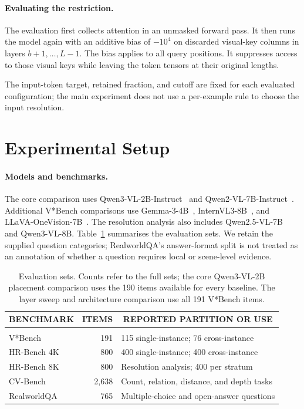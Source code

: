 \documentclass{article} %
\begin{document}
\paragraph{Evaluating the restriction.}
The evaluation first collects attention in an unmasked forward pass.
It then runs the model again with an additive bias of \(-10^4\) on
discarded visual-key columns in layers \(b+1,\ldots,L-1\). The bias
applies to all query positions. It suppresses access to those visual
keys while leaving the token tensors at their original lengths.

The input-token target, retained fraction, and cutoff are fixed for
each evaluated configuration; the main experiment does not use a
per-example rule to choose the input resolution.

\section{Experimental Setup}
\label{sec:method_evaluation}


\paragraph{Models and benchmarks.}
The core comparison uses Qwen3-VL-2B-Instruct~\citep{qwen3vl}
and Qwen2-VL-7B-Instruct~\citep{wang2024qwen2vl}.
Additional V*Bench comparisons use Gemma-3-4B~\citep{gemma3},
InternVL3-8B~\citep{internvl3}, and
LLaVA-OneVision-7B~\citep{li2024llavaonevision}. The resolution analysis
also includes Qwen2.5-VL-7B~\citep{qwen25vl} and Qwen3-VL-8B. Table~\ref{tab:eval_data} summarises
the evaluation sets. We retain the supplied question categories;
RealworldQA's answer-format split is not treated as an annotation of
whether a question requires local or scene-level evidence.

\begin{table}[t]
\caption{Evaluation sets. Counts refer to the full sets; the core
Qwen3-VL-2B placement comparison uses the 190 items available for every
baseline. The layer sweep and architecture comparison use all 191
V*Bench items.}
\label{tab:eval_data}
\begin{center}
\begin{tabular}{lrl}
\multicolumn{1}{c}{\bf BENCHMARK} &
\multicolumn{1}{c}{\bf ITEMS} &
\multicolumn{1}{c}{\bf REPORTED PARTITION OR USE}
\\ \hline \\
V*Bench~\citep{vstar} & 191 & 115 single-instance; 76 cross-instance \\
HR-Bench 4K~\citep{hrbench} & 800 & 400 single-instance; 400 cross-instance \\
HR-Bench 8K~\citep{hrbench} & 800 & Resolution analysis; 400 per stratum \\
CV-Bench~\citep{cambrian1} & 2,638 & Count, relation, distance, and depth tasks \\
RealworldQA~\citep{xai2024realworldqa} & 765 & Multiple-choice and open-answer questions \\
\end{tabular}
\end{center}
\end{table}
\end{document}
